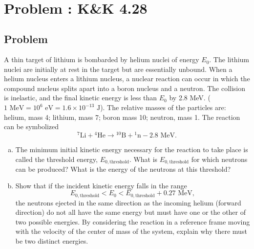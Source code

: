 \documentclass[solutions]{esg8012pset}
\begin{document}
\begin{align*}
  \end{align*}
\section{Problem \thesection: K\&K 4.28}
\subsection{Problem}
  A thin target of lithium is bombarded by helium nuclei of energy $E_0$. The lithium nuclei are initially at rest in the target but are essentially unbound. When a helium nucleus enters a lithium nucleus, a nuclear reaction can occur in which the compound nucleus splits apart into a boron nucleus and a neutron. The collision is inelastic, and the final kinetic energy is less than $E_0$ by 2.8 MeV. ($1\text{ MeV} = 10^6\text{ eV} = 1.6 \times 10^{-13}\text{ J}$). The relative masses of the particles are: helium, mass 4; lithium, mass 7; boron mass 10; neutron, mass 1. The reaction can be symbolized
  $${}^7\text{Li} + {}^4\text{He} \to {}^{10}\text{B} + {}^1\text{n} - 2.8\text{ MeV}.$$
  \begin{enumerate}[(a)]
  \item The minimum initial kinetic energy necessary for the reaction to take place is called the threshold energy, $E_{0,\text{threshold}}$. What is $E_{0,\text{threshold}}$ for which neutrons can be produced? What is the energy of the neutrons at this threshold?
    \item Show that if the incident kinetic energy falls in the range $$E_{0,\text{threshold}} < E_0 < E_{0,\text{threshold}} + 0.27\text{ MeV},$$ the neutrons ejected in the same direction as the incoming helium (forward direction) do not all have the same energy but must have one or the other of two possible energies. By considering the reaction in a reference frame moving with the velocity of the center of mass of the system, explain why there must be two distinct energies.
  \end{enumerate}
\end{document}
